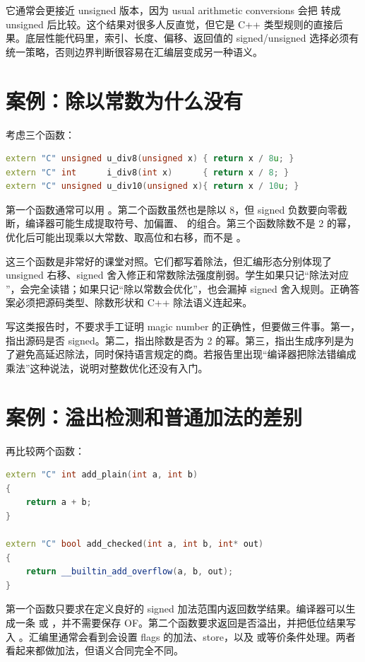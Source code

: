 它通常会更接近 unsigned 版本，因为 usual arithmetic conversions 会把  转成 unsigned 后比较。这个结果对很多人反直觉，但它是 C++ 类型规则的直接后果。底层性能代码里，索引、长度、偏移、返回值的 signed/unsigned 选择必须有统一策略，否则边界判断很容易在汇编层变成另一种语义。

\section{案例：除以常数为什么没有 }

考虑三个函数：

\begin{lstlisting}[language=C++]
extern "C" unsigned u_div8(unsigned x) { return x / 8u; }
extern "C" int      i_div8(int x)      { return x / 8; }
extern "C" unsigned u_div10(unsigned x){ return x / 10u; }
\end{lstlisting}

第一个函数通常可以用 。第二个函数虽然也是除以 8，但 signed 负数要向零截断，编译器可能生成提取符号、加偏置、 的组合。第三个函数除数不是 2 的幂，优化后可能出现乘以大常数、取高位和右移，而不是 。

这三个函数是非常好的课堂对照。它们都写着除法，但汇编形态分别体现了 unsigned 右移、signed 舍入修正和常数除法强度削弱。学生如果只记“除法对应 ”，会完全读错；如果只记“除以常数会优化”，也会漏掉 signed 舍入规则。正确答案必须把源码类型、除数形状和 C++ 除法语义连起来。

写这类报告时，不要求手工证明 magic number 的正确性，但要做三件事。第一，指出源码是否 signed。第二，指出除数是否为 2 的幂。第三，指出生成序列是为了避免高延迟除法，同时保持语言规定的商。若报告里出现“编译器把除法错编成乘法”这种说法，说明对整数优化还没有入门。

\section{案例：溢出检测和普通加法的差别}

再比较两个函数：

\begin{lstlisting}[language=C++]
extern "C" int add_plain(int a, int b)
{
    return a + b;
}

extern "C" bool add_checked(int a, int b, int* out)
{
    return __builtin_add_overflow(a, b, out);
}
\end{lstlisting}

第一个函数只要求在定义良好的 signed 加法范围内返回数学结果。编译器可以生成一条  或 ，并不需要保存 OF。第二个函数要求返回是否溢出，并把低位结果写入 。汇编里通常会看到会设置 flags 的加法、store，以及  或等价条件处理。两者看起来都做加法，但语义合同完全不同。

